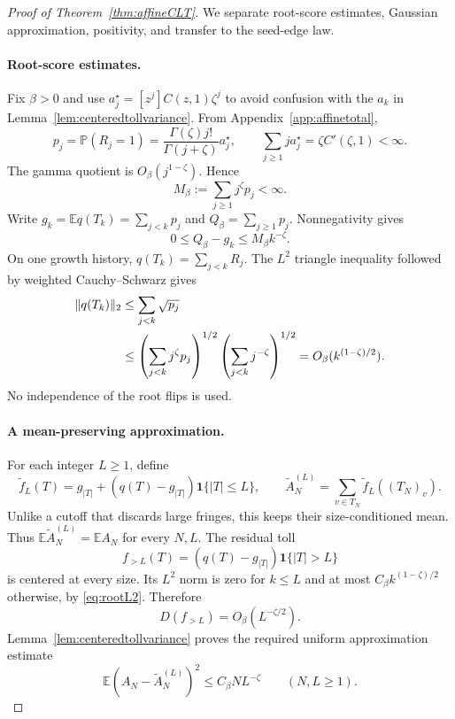 \documentclass[runningheads,envcountsame,orivec]{llncs}
\newcommand{\E}{\mathbb E}
\newcommand{\PP}{\mathbb P}
\newcommand{\ind}{\mathbf 1}
\begin{document}
\begin{proof}[Proof of Theorem~\ref{thm:affineCLT}]
We separate root-score estimates, Gaussian approximation, positivity,
and transfer to the seed-edge law.

\paragraph{Root-score estimates.}
Fix $\beta>0$ and use $a_j^{\star}=[z^j]C(z,1)\zeta^j$ to avoid confusion with the
$a_k$ in Lemma~\ref{lem:centeredtollvariance}. From
Appendix~\ref{app:affinetotal},
\[
 p_j=\PP(R_j=1)
   =\frac{\Gamma(\zeta)j!}{\Gamma(j+\zeta)}a_j^{\star},
 \qquad \sum_{j\ge1}j a_j^{\star}=\zeta C'(\zeta,1)<\infty.
\]
The gamma quotient is $O_\beta(j^{1-\zeta})$. Hence
\begin{equation}\label{eq:weightedrootflips}
 M_\beta:=\sum_{j\ge1}j^\zeta p_j<\infty.
\end{equation}
Write $g_k=\E q(T_k)=\sum_{j<k}p_j$ and
$Q_\beta=\sum_{j\ge1}p_j$. Nonnegativity gives
\begin{equation}\label{eq:rootmeantail}
 0\le Q_\beta-g_k\le M_\beta k^{-\zeta}.
\end{equation}
On one growth history, $q(T_k)=\sum_{j<k}R_j$. The $L^2$ triangle
inequality followed by weighted Cauchy--Schwarz gives
\begin{align}
 \|q(T_k)\|_2
 &\le\sum_{j<k}\sqrt{p_j}\notag\\
 &\le\left(\sum_{j<k}j^\zeta p_j\right)^{1/2}
       \left(\sum_{j<k}j^{-\zeta}\right)^{1/2}
 =O_\beta(k^{(1-\zeta)/2}).\label{eq:rootL2}
\end{align}
No independence of the root flips is used.

\paragraph{A mean-preserving approximation.}
For each integer $L\ge1$, define
\begin{equation}\label{eq:meanpreservingapprox}
 \widetilde f_L(T)=g_{|T|}
      +(q(T)-g_{|T|})\ind\{|T|\le L\},\qquad
 \widetilde A_N^{(L)}=\sum_{v\in T_N}\widetilde f_L((T_N)_v).
\end{equation}
Unlike a cutoff that discards large fringes, this keeps their
size-conditioned mean. Thus $\E\widetilde A_N^{(L)}=\E A_N$
for every $N,L$. The residual toll
\[
 f_{>L}(T)=(q(T)-g_{|T|})\ind\{|T|>L\}
\]
is centered at every size. Its $L^2$ norm is zero for $k\le L$ and
at most $C_\beta k^{(1-\zeta)/2}$ otherwise, by
\eqref{eq:rootL2}. Therefore
\[
 D(f_{>L})=O_\beta(L^{-\zeta/2}).
\]
Lemma~\ref{lem:centeredtollvariance} proves the required uniform
approximation estimate
\begin{equation}\label{eq:CLTtailbound}
 \E(A_N-\widetilde A_N^{(L)})^2
 \le C_\beta N L^{-\zeta}\qquad(N,L\ge1).
\end{equation}


\end{proof}
\end{document}
